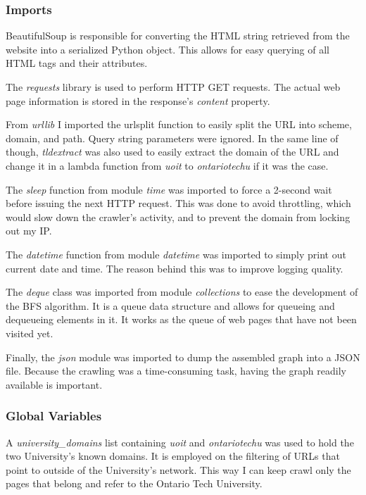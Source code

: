 \subsubsection{Imports}
BeautifulSoup is responsible for converting the HTML string retrieved from the website into a serialized Python object. This allows for easy querying of all HTML tags and their attributes.

The \textit{requests} library is used to perform HTTP GET requests. The actual web page information is stored in the response's \textit{content} property.

From \textit{urllib} I imported the urlsplit function to easily split the URL into scheme, domain, and path. Query string parameters were ignored. In the same line of though, \textit{tldextract} was also used to easily extract the domain of the URL and change it in a lambda function from \textit{uoit} to \textit{ontariotechu} if it was the case.

The \textit{sleep} function from module \textit{time} was imported to force a 2-second wait before issuing the next HTTP request. This was done to avoid throttling, which would slow down the crawler's activity, and to prevent the domain from locking out my IP.

The \textit{datetime} function from module \textit{datetime} was imported to simply print out current date and time. The reason behind this was to improve logging quality.

The \textit{deque} class was imported from module \textit{collections} to ease the development of the BFS algorithm. It is a queue data structure and allows for queueing and dequeueing elements in it. It works as the queue of web pages that have not been visited yet.

Finally, the \textit{json} module was imported to dump the assembled graph into a JSON file. Because the crawling was a time-consuming task, having the graph readily available is important.

\subsubsection{Global Variables}
A \textit{university\_domains} list containing \textit{uoit} and \textit{ontariotechu} was used to hold the two University's known domains. It is employed on the filtering of URLs that point to outside of the University's network. This way I can keep crawl only the pages that belong and refer to the Ontario Tech University.

